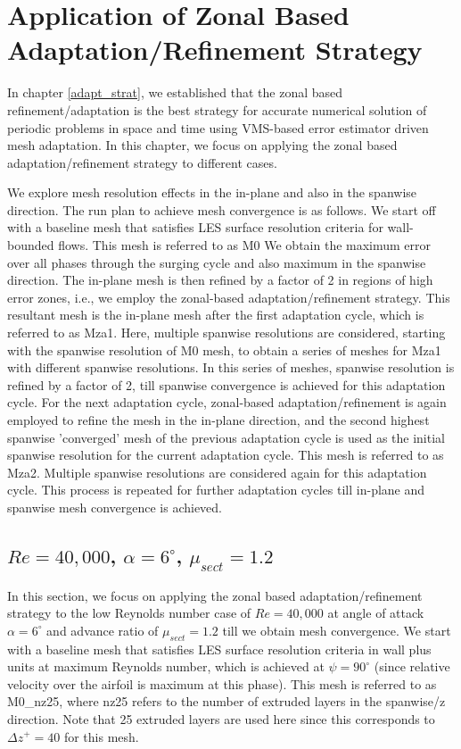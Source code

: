 \chapter{Application of Zonal Based Adaptation/Refinement Strategy}

In chapter \ref{adapt_strat}, we established that the zonal based refinement/adaptation is the best strategy for accurate numerical solution of periodic problems in space and time using VMS-based error estimator driven mesh adaptation. In this chapter, we focus on applying the zonal based adaptation/refinement strategy to different cases.

We explore mesh resolution effects in the in-plane and also in the spanwise direction. 
The run plan to achieve mesh convergence is as follows. 
We start off with a baseline mesh that satisfies LES surface resolution criteria for wall-bounded flows. This mesh is referred to as M0
We obtain the maximum error over all phases through the surging cycle and also maximum in the spanwise direction.
The in-plane mesh is then refined by a factor of 2 in regions of high error zones, i.e., we employ the zonal-based adaptation/refinement strategy.
This resultant mesh is the in-plane mesh after the first adaptation cycle, which is referred to as Mza1.
Here, multiple spanwise resolutions are considered, starting with the spanwise resolution of M0 mesh, to obtain a series of meshes for Mza1 with different spanwise resolutions.
In this series of meshes, spanwise resolution is refined by a factor of 2, till spanwise convergence is achieved for this adaptation cycle. 
For the next adaptation cycle, zonal-based adaptation/refinement is again employed to refine the mesh in the in-plane direction, and the second highest spanwise 'converged' mesh of the previous adaptation cycle is used as the initial spanwise resolution for the current adaptation cycle. 
This mesh is referred to as Mza2.
Multiple spanwise resolutions are considered again for this adaptation cycle.
This process is repeated for further adaptation cycles till in-plane and spanwise mesh convergence is achieved.

\section{ $Re=40,000$,  $\alpha=6^\circ$, $\mu_{sect}=1.2$}

In this section, we focus on applying the zonal based adaptation/refinement strategy to the low Reynolds number case of $Re=40,000$ at angle of attack $\alpha=6^\circ$ and advance ratio of $\mu_{sect}=1.2$ till we obtain mesh convergence.
We start with a baseline mesh that satisfies LES surface resolution criteria in wall plus units at maximum Reynolds number, which is achieved at $\psi=90^\circ$ (since relative velocity over the airfoil is maximum at this phase). 
This mesh is referred to as M0\_nz25, where nz25 refers to the number of extruded layers in the spanwise/z direction. Note that 25 extruded layers are used here since this corresponds to $\Delta z^+ = 40$ for this mesh.


